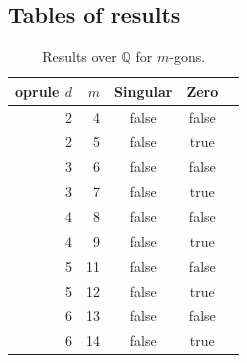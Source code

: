 

\subsection{Tables of results}

\begin{table}[htbp]
    \centering
    \caption{Results over $\mathbb{Q}$ for $m$-gons.}
    \label{tab:mgon-results_Q}
    \small
    \begin{tabular}{r r c c r}
        	oprule
        $d$ & $m$ & Singular & Zero \\
        \midrule
        2 & 4  & false & false \\
        2 & 5  & false & true  \\
        3 & 6  & false & false \\
        3 & 7  & false & true  \\
        4 & 8  & false & false \\
        4 & 9  & false & true  \\
        5 & 11 & false & false \\
        5 & 12 & false & true  \\
        6 & 13 & false & false \\
        6 & 14 & false & true  \\
        \bottomrule
    \end{tabular}
\end{table}

